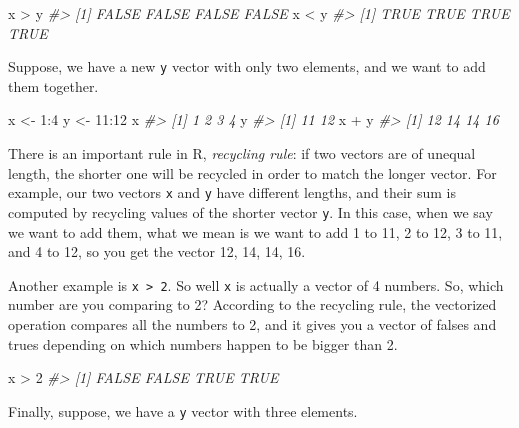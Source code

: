 \documentclass[
]{book}
\newenvironment{Shaded}{\begin{snugshade}}{\end{snugshade}}
\newcommand{\CommentTok}[1]{\textcolor[rgb]{0.56,0.35,0.01}{\textit{#1}}}
\newcommand{\DecValTok}[1]{\textcolor[rgb]{0.00,0.00,0.81}{#1}}
\newcommand{\NormalTok}[1]{#1}
\newcommand{\OtherTok}[1]{\textcolor[rgb]{0.56,0.35,0.01}{#1}}
\newcommand{\SpecialCharTok}[1]{\textcolor[rgb]{0.00,0.00,0.00}{#1}}
\begin{document}
\begin{Shaded}
\begin{Highlighting}[]
\NormalTok{x }\SpecialCharTok{\textgreater{}}\NormalTok{ y}
\CommentTok{\#\textgreater{} [1] FALSE FALSE FALSE FALSE}
\NormalTok{x }\SpecialCharTok{\textless{}}\NormalTok{ y}
\CommentTok{\#\textgreater{} [1] TRUE TRUE TRUE TRUE}
\end{Highlighting}
\end{Shaded}

Suppose, we have a new \texttt{y} vector with only two elements, and we want to add them together.

\begin{Shaded}
\begin{Highlighting}[]
\NormalTok{x }\OtherTok{\textless{}{-}} \DecValTok{1}\SpecialCharTok{:}\DecValTok{4}
\NormalTok{y }\OtherTok{\textless{}{-}} \DecValTok{11}\SpecialCharTok{:}\DecValTok{12}
\NormalTok{x}
\CommentTok{\#\textgreater{} [1] 1 2 3 4}
\NormalTok{y}
\CommentTok{\#\textgreater{} [1] 11 12}
\NormalTok{x }\SpecialCharTok{+}\NormalTok{ y}
\CommentTok{\#\textgreater{} [1] 12 14 14 16}
\end{Highlighting}
\end{Shaded}

There is an important rule in R, \emph{recycling rule}: if two vectors are of unequal length, the shorter one will be recycled in order to match the longer vector. For example, our two vectors \texttt{x} and \texttt{y} have different lengths, and their sum is computed by recycling values of the shorter vector \texttt{y}. In this case, when we say we want to add them, what we mean is we want to add 1 to 11, 2 to 12, 3 to 11, and 4 to 12, so you get the vector 12, 14, 14, 16.

Another example is \texttt{x\ \textgreater{}\ 2}. So well \texttt{x} is actually a vector of 4 numbers. So, which number are you comparing to 2?
According to the recycling rule, the vectorized operation compares all the numbers to 2, and it gives you a vector of falses and trues depending on which numbers happen to be bigger than 2.

\begin{Shaded}
\begin{Highlighting}[]
\NormalTok{x }\SpecialCharTok{\textgreater{}} \DecValTok{2}
\CommentTok{\#\textgreater{} [1] FALSE FALSE  TRUE  TRUE}
\end{Highlighting}
\end{Shaded}

Finally, suppose, we have a \texttt{y} vector with three elements.
\end{document}

